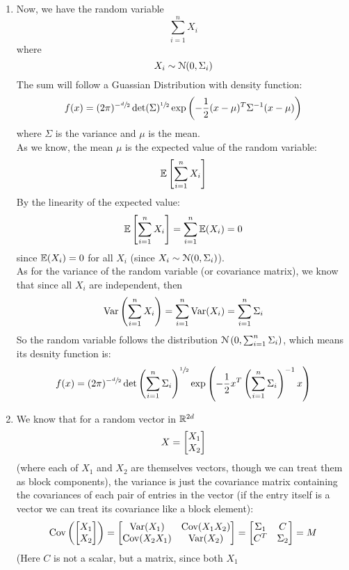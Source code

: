 \documentclass[12pt]{article}
\begin{document}
    \begin{enumerate}[label=\alph*)]
        \item 
        Now, we have the random variable
        \[ \sum_{i = 1}^{n} X_i \]
        where 
        \[ X_i \sim \mathcal{N}(0, \Sigma_i) \]
        The sum will follow a Guassian Distribution
        with density function:
        \[ f(x) = (2\pi)^{-\sfrac{d}{2}}
        \det(\Sigma)^{\sfrac{1}{2}}
        \exp\left( -\dfrac{1}{2}(x-\mu)^T
        \Sigma^{-1} (x - \mu) \right) \]
        where $\Sigma$ is the variance
        and $\mu$ is the mean. \\
        As we know, the mean $\mu$
        is the expected value of the
        random variable:
        \[ \mathbb{E}\left[ \sum_{i = 1}^{n} X_i \right] \]
        By the linearity of the expected value:
        \[ \mathbb{E}\left[ \sum_{i = 1}^{n} X_i \right] =
        \sum_{i = 1}^{n} \mathbb{E}(X_i) = 0 \]
        since $\mathbb{E}(X_i) = 0$ for all $X_i$
        (since $X_i \sim \mathcal{N}(0, \Sigma_i)$). \\
        As for the variance of the random
        variable (or covariance matrix),
        we know that since all $X_i$
        are independent,
        then 
        \[ \text{Var}\left( \sum_{i=1}^{n}X_i \right) = 
        \sum_{i=1}^{n} \text{Var}(X_i)
        = \sum_{i=1}^{n} \Sigma_i \]
        So the random variable follows
        the distribution 
        $\mathcal{N}\left( 0, \sum_{i=1}^{n} \Sigma_i \right)$,
        which means its desnity function is:
         \[ f(x) = (2\pi)^{-\sfrac{d}{2}}
        \det\left( \sum_{i=1}^{n} \Sigma_i \right)^{\sfrac{1}{2}}
        \exp\left( -\dfrac{1}{2}x^T
        \left( \sum_{i=1}^{n} \Sigma_i \right)^{-1} x \right) \]
        \item 
        We know that for a random vector
        in $\mathbb{R}^{2d}$
        \[ X = \begin{bmatrix} {X_1}\\{X_2} \end{bmatrix} \]
        (where each of $X_1$ and $X_2$
        are themselves vectors, though we
        can treat them as block components),
        the variance is just
        the covariance matrix
        containing the covariances of each
        pair of entries in the vector
        (if the entry itself is a vector
        we can treat its covariance like 
        a block element):
        \[ \text{Cov}\left( \begin{bmatrix} {X_1} \\ {X_2} \end{bmatrix} \right)
        = \begin{bmatrix} {\text{Var}(X_1)} & {\text{Cov}(X_1X_2)} \\
        {\text{Cov}(X_2X_1)} & {\text{Var}(X_2)}  \end{bmatrix}
        = \begin{bmatrix} {\Sigma_1} & {C} \\
        {C^{T}} & {\Sigma_2} \end{bmatrix} = M \]
        (Here $C$ is not a scalar,
        but a matrix, since both $X_1$

\end{enumerate}
\end{document}
